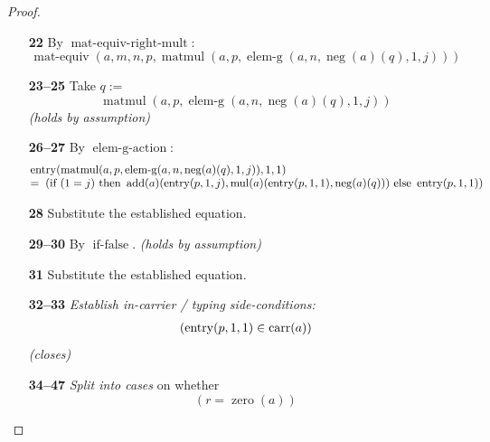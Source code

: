 \documentclass[11pt]{article}
\theoremstyle{plain}
\begin{document}
\begin{proof}
\begin{itemize}[leftmargin=2.8em, itemsep=4pt, parsep=1pt]
  \item[\textbf{22}] By $\operatorname{mat\text{-}equiv\text{-}right\text{-}mult}$:
\begin{equation*}
\operatorname{mat\text{-}equiv}(a, m, n, p, \operatorname{matmul}(a, p, \operatorname{elem\text{-}g}(a, n, \operatorname{neg}(a)(q), 1, j)))
\end{equation*}

  \item[\textbf{23--25}] Take $q :=$
\begin{equation*}
\operatorname{matmul}(a, p, \operatorname{elem\text{-}g}(a, n, \operatorname{neg}(a)(q), 1, j))
\end{equation*}
  \emph{(holds by assumption)}
  \item[\textbf{26--27}] By $\operatorname{elem\text{-}g\text{-}action}$:
\begin{equation*}
\begin{array}{@{}l@{}} \operatorname{entry}(\operatorname{matmul}(a, p, \operatorname{elem\text{-}g}(a, n, \operatorname{neg}(a)(q), 1, j)), 1, 1) \\ =\; \left(\text{if }(1 = j)\text{ then }\operatorname{add}(a)(\operatorname{entry}(p, 1, j), \operatorname{mul}(a)(\operatorname{entry}(p, 1, 1), \operatorname{neg}(a)(q)))\text{ else }\operatorname{entry}(p, 1, 1)\right) \end{array}
\end{equation*}

  \item[\textbf{28}] Substitute the established equation.
  \item[\textbf{29--30}] By $\operatorname{if\text{-}false}$.  \emph{(holds by assumption)}
  \item[\textbf{31}] Substitute the established equation.
  \item[\textbf{32--33}] \emph{Establish in-carrier / typing side-conditions:}
\begin{equation*}
\begin{array}{@{}l@{}}
(\operatorname{entry}(p, 1, 1) \in \operatorname{carr}(a))
\end{array}
\end{equation*}
  \emph{(closes)}
  \item[\textbf{34--47}] \emph{Split into cases} on whether
\begin{equation*}
(r = \operatorname{zero}(a))
\end{equation*}


\end{itemize}
\end{proof}
\end{document}
